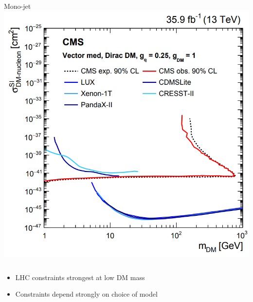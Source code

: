 \documentclass[aspectratio=169,xcolor=dvipsnames,,table,compress]{beamer}
\begin{document}
\begin{frame}
\begin{columns}[T]
\begin{column}{0.33\textwidth}
      \centering
      Mono-jet \\
      \includegraphics[width=\textwidth]{../figures/talk/monojet.png}
    \end{column}
  \end{columns}
  \begin{itemize}
    \item LHC constraints strongest at low DM mass
    \item Constraints depend strongly on choice of model
  \end{itemize}
\end{frame}
\end{document}
